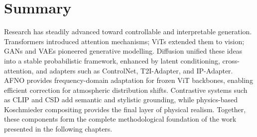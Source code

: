 \section*{Summary}

Research has steadily advanced toward controllable and interpretable generation.
Transformers introduced attention mechanisms; ViTs extended them to vision; GANs and VAEs pioneered generative modelling.
Diffusion unified these ideas into a stable probabilistic framework, enhanced by latent conditioning, cross-attention, and adapters such as ControlNet, T2I-Adapter, and IP-Adapter.
AFNO provides frequency-domain adaptation for frozen ViT backbones, enabling efficient correction for atmospheric distribution shifts.
Contrastive systems such as CLIP and CSD add semantic and stylistic grounding, while physics-based Koschmieder compositing provides the final layer of physical realism.
Together, these components form the complete methodological foundation of the work presented in the following chapters.

